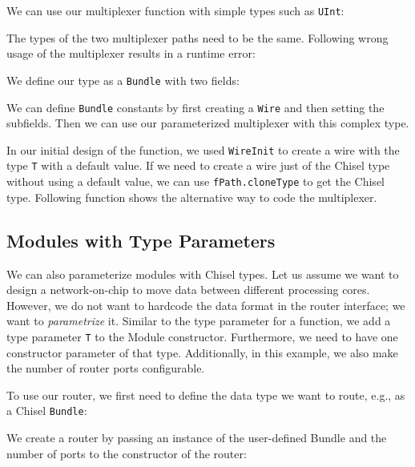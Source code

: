 \documentclass[%
    10pt,
    headinclude, footexclude,
    openright, %
    notitlepage,
    cleardoubleempty,
    headsepline,
    pointlessnumbers,
    bibtotoc, idxtotoc,
    ]{scrbook}
\newcommand{\code}[1]{{\small{\texttt{#1}}}}
\begin{document}
We can use our multiplexer function with simple types such as
\code{UInt}:


\noindent The types of the two multiplexer paths need to be the same.
Following wrong usage of the multiplexer results in a runtime error:


\noindent We define our type as a \code{Bundle} with two fields:


\noindent We can define \code{Bundle} constants by first creating
a \code{Wire} and then setting the subfields.
Then we can use our parameterized multiplexer with this complex type.


In our initial design of the function, we used \code{WireInit}
to create a wire with the type \code{T} with a default value.
If we need to create a wire just of the Chisel type without using a default
value, we can use \code{fPath.cloneType} to get the Chisel type.
Following function shows the alternative way to code the multiplexer.


\subsection{Modules with Type Parameters}

We can also parameterize modules with Chisel types.
Let us assume we want to design a network-on-chip to move data between
different processing cores. However, we do not want to hardcode the
data format in the router interface; we want to \emph{parametrize} it.
Similar to the type parameter for a function, we add a type parameter \code{T}
to the Module constructor. Furthermore, we need to have one constructor
parameter of that type. Additionally, in this example, we also make the number
of router ports configurable.


\noindent To use our router, we first need to define the data type we want to route, e.g.,
as a Chisel \code{Bundle}:


\noindent We create a router by passing an instance of the user-defined Bundle and
the number of ports to the constructor of the router:
\end{document}
